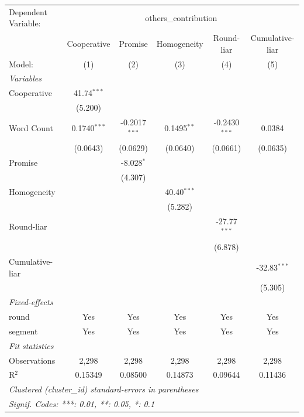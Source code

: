 
\begingroup
\centering
\begin{tabular}{lccccc}
   \tabularnewline \midrule \midrule
   Dependent Variable: & \multicolumn{5}{c}{others\_contribution}\\
                   & Cooperative    & Promise         & Homogeneity   & Round-liar      & Cumulative-liar \\   
   Model:          & (1)            & (2)             & (3)           & (4)             & (5)\\  
   \midrule
   \emph{Variables}\\
   Cooperative     & 41.74$^{***}$  &                 &               &                 &   \\   
                   & (5.200)        &                 &               &                 &   \\   
   Word Count      & 0.1740$^{***}$ & -0.2017$^{***}$ & 0.1495$^{**}$ & -0.2430$^{***}$ & 0.0384\\   
                   & (0.0643)       & (0.0629)        & (0.0640)      & (0.0661)        & (0.0635)\\   
   Promise         &                & -8.028$^{*}$    &               &                 &   \\   
                   &                & (4.307)         &               &                 &   \\   
   Homogeneity     &                &                 & 40.40$^{***}$ &                 &   \\   
                   &                &                 & (5.282)       &                 &   \\   
   Round-liar      &                &                 &               & -27.77$^{***}$  &   \\   
                   &                &                 &               & (6.878)         &   \\   
   Cumulative-liar &                &                 &               &                 & -32.83$^{***}$\\   
                   &                &                 &               &                 & (5.305)\\   
   \midrule
   \emph{Fixed-effects}\\
   round           & Yes            & Yes             & Yes           & Yes             & Yes\\  
   segment         & Yes            & Yes             & Yes           & Yes             & Yes\\  
   \midrule
   \emph{Fit statistics}\\
   Observations    & 2,298          & 2,298           & 2,298         & 2,298           & 2,298\\  
   R$^2$           & 0.15349        & 0.08500         & 0.14873       & 0.09644         & 0.11436\\  
   \midrule \midrule
   \multicolumn{6}{l}{\emph{Clustered (cluster\_id) standard-errors in parentheses}}\\
   \multicolumn{6}{l}{\emph{Signif. Codes: ***: 0.01, **: 0.05, *: 0.1}}\\
\end{tabular}
\par\endgroup


